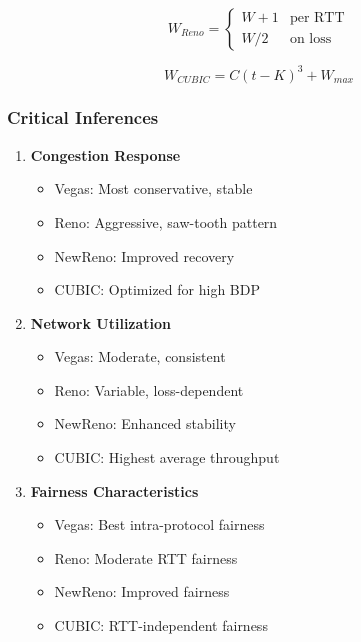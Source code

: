 \documentclass[11pt,a4paper]{article}
\begin{document}
\begin{tcolorbox}[
    enhanced,
    colback=white,
    colframe=red!75!black,
    title=Comparative Analysis of TCP Variants]
\begin{enumerate}
    \begin{equation}
        W_{Reno} = 
        \begin{cases}
            W + 1 & \text{per RTT} \\
            W/2 & \text{on loss}
        \end{cases}
    \end{equation}

    \begin{equation}
        W_{CUBIC} = C(t-K)^3 + W_{max}
    \end{equation}
\end{enumerate}

\subsubsection{Critical Inferences}
\begin{enumerate}
    \item \textbf{Congestion Response}
    \begin{itemize}
        \item Vegas: Most conservative, stable
        \item Reno: Aggressive, saw-tooth pattern
        \item NewReno: Improved recovery
        \item CUBIC: Optimized for high BDP
    \end{itemize}

    \item \textbf{Network Utilization}
    \begin{itemize}
        \item Vegas: Moderate, consistent
        \item Reno: Variable, loss-dependent
        \item NewReno: Enhanced stability
        \item CUBIC: Highest average throughput
    \end{itemize}

    \item \textbf{Fairness Characteristics}
    \begin{itemize}
        \item Vegas: Best intra-protocol fairness
        \item Reno: Moderate RTT fairness
        \item NewReno: Improved fairness
        \item CUBIC: RTT-independent fairness
    \end{itemize}
\end{enumerate}
\end{tcolorbox}
\end{document}
